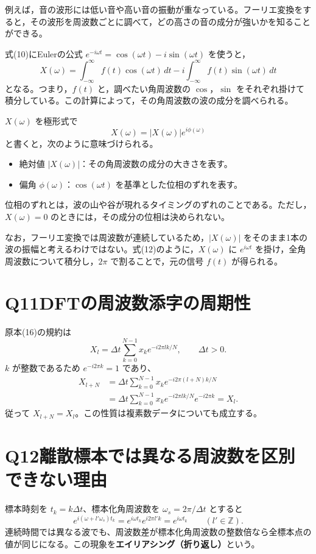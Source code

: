 \documentclass[a4paper,11pt]{article}
\newcommand{\Q}[2]{\section*{Q#1\quad #2}}
\begin{document}
例えば，音の波形には低い音や高い音の振動が重なっている。フーリエ変換をすると，その波形を周波数ごとに調べて，どの高さの音の成分が強いかを知ることができる。

式(10)にEulerの公式 $e^{-i\omega t}=\cos(\omega t)-i\sin(\omega t)$ を使うと，
\[
X(\omega)
=\int_{-\infty}^{\infty}f(t)\cos(\omega t)\,dt
-i\int_{-\infty}^{\infty}f(t)\sin(\omega t)\,dt
\]
となる。つまり，$f(t)$ と，調べたい角周波数の $\cos$，$\sin$ をそれぞれ掛けて積分している。この計算によって，その角周波数の波の成分を調べられる。

$X(\omega)$ を極形式で
\[
X(\omega)=|X(\omega)|e^{i\phi(\omega)}
\]
と書くと，次のように意味づけられる。
\begin{itemize}
\item 絶対値 $|X(\omega)|$：その角周波数の成分の大きさを表す。
\item 偏角 $\phi(\omega)$：$\cos(\omega t)$ を基準とした位相のずれを表す。
\end{itemize}
位相のずれとは，波の山や谷が現れるタイミングのずれのことである。ただし，$X(\omega)=0$ のときには，その成分の位相は決められない。

なお，フーリエ変換では周波数が連続しているため，$|X(\omega)|$ をそのまま1本の波の振幅と考えるわけではない。式(12)のように，$X(\omega)$ に $e^{i\omega t}$ を掛け，全角周波数について積分し，$2\pi$ で割ることで，元の信号 $f(t)$ が得られる。
\newpage
\Q{11}{DFTの周波数添字の周期性}
原本(16)の規約は
\[
X_l=\Delta t\sum_{k=0}^{N-1}x_ke^{-i2\pi lk/N},\qquad \Delta t>0.
\]
$k$ が整数であるため $e^{-i2\pi k}=1$ であり、
\begin{align*}
X_{l+N}&=\Delta t\sum_{k=0}^{N-1}x_ke^{-i2\pi(l+N)k/N}\\
&=\Delta t\sum_{k=0}^{N-1}x_ke^{-i2\pi lk/N}e^{-i2\pi k}=X_l.
\end{align*}
従って $\boxed{X_{l+N}=X_l}$。この性質は複素数データについても成立する。

\Q{12}{離散標本では異なる周波数を区別できない理由}
標本時刻を $t_k=k\Delta t$、標本化角周波数を $\omega_s=2\pi/\Delta t$ とすると
\[
e^{i(\omega+l'\omega_s)t_k}
=e^{i\omega t_k}e^{i2\pi l'k}=e^{i\omega t_k}\qquad(l'\in\mathbb Z).
\]
連続時間では異なる波でも、周波数差が標本化角周波数の整数倍なら全標本点の値が同じになる。この現象を\textbf{エイリアシング（折り返し）}という。
\end{document}
